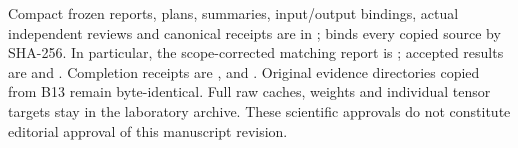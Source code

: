 Compact frozen reports, plans, summaries, input/output bindings, actual independent reviews and canonical receipts are in ;  binds every copied source by SHA-256. In particular, the scope-corrected matching report is ; accepted results are  and . Completion receipts are ,  and . Original evidence directories copied from B13 remain byte-identical. Full raw caches, weights and individual tensor targets stay in the laboratory archive. These scientific approvals do not constitute editorial approval of this manuscript revision.


\clearpage
\small
